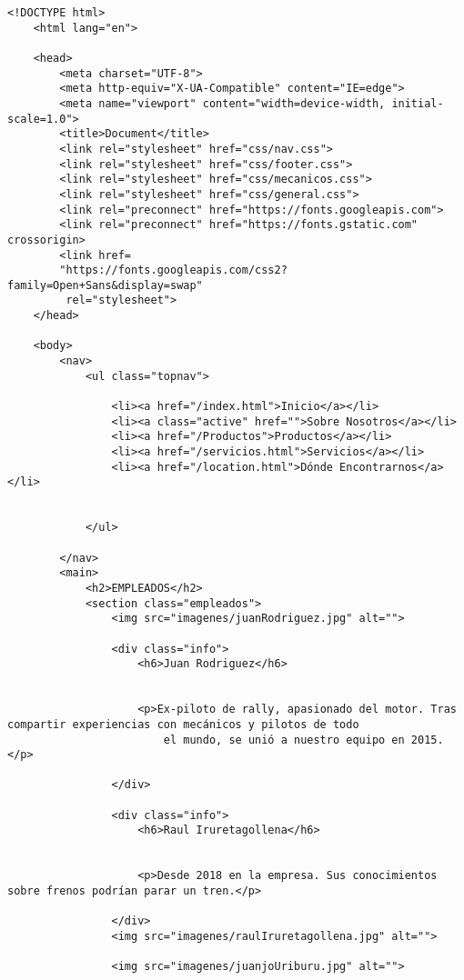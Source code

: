 \begin{lstlisting}[caption=mecanicos.html (LMSI)]
    <!DOCTYPE html>
    <html lang="en">
    
    <head>
        <meta charset="UTF-8">
        <meta http-equiv="X-UA-Compatible" content="IE=edge">
        <meta name="viewport" content="width=device-width, initial-scale=1.0">
        <title>Document</title>
        <link rel="stylesheet" href="css/nav.css">
        <link rel="stylesheet" href="css/footer.css">
        <link rel="stylesheet" href="css/mecanicos.css">
        <link rel="stylesheet" href="css/general.css">
        <link rel="preconnect" href="https://fonts.googleapis.com">
        <link rel="preconnect" href="https://fonts.gstatic.com" crossorigin>
        <link href=
        "https://fonts.googleapis.com/css2?family=Open+Sans&display=swap"
         rel="stylesheet">
    </head>
    
    <body>
        <nav>
            <ul class="topnav">
    
                <li><a href="/index.html">Inicio</a></li>
                <li><a class="active" href="">Sobre Nosotros</a></li>
                <li><a href="/Productos">Productos</a></li>
                <li><a href="/servicios.html">Servicios</a></li>
                <li><a href="/location.html">Dónde Encontrarnos</a></li>
    
    
            </ul>
    
        </nav>
        <main>
            <h2>EMPLEADOS</h2>
            <section class="empleados">
                <img src="imagenes/juanRodriguez.jpg" alt="">
    
                <div class="info">
                    <h6>Juan Rodriguez</h6>
    
    
                    <p>Ex-piloto de rally, apasionado del motor. Tras compartir experiencias con mecánicos y pilotos de todo
                        el mundo, se unió a nuestro equipo en 2015.</p>
    
                </div>
    
                <div class="info">
                    <h6>Raul Iruretagollena</h6>
    
    
                    <p>Desde 2018 en la empresa. Sus conocimientos sobre frenos podrían parar un tren.</p>
    
                </div>
                <img src="imagenes/raulIruretagollena.jpg" alt="">
    
                <img src="imagenes/juanjoUriburu.jpg" alt="">
    

\end{lstlisting}

